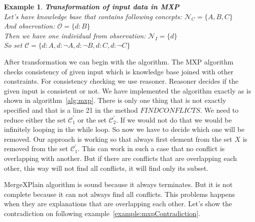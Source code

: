 \documentclass[12pt,a4paper]{article}
\newtheorem{example}{Example}[subsection]
\begin{document}
\begin{example}{\textbf{Transformation of input data in MXP}} \\
	\label{example:mxpTransform}
	\noindent Let's have knowledge base that contains following concepts: 
	$\mathcal{N}_{C} = \{ A, B, C \}$ \\
	And observation: $\mathcal{O} = \{ d:B \}$ \\
	Then we have one individual from observation: $\mathcal{N}_{I} = \{ d \} $ \\
	So set $\mathcal{C} = \{ d:A, d:\neg A, d:\neg B, d:C, d:\neg C \}$
\end{example}

After transformation we can begin with the algorithm. The MXP algorithm checks consistency of given input which is knowledge base joined with other constraints. For consistency checking we use reasoner. Reasoner decides if the given input is consistent or not. We have implemented the algorithm exactly as is shown in algorithm~\ref{alg:mxp}. There is only one thing that is not exactly specified and that is a line 21 in the method $\mathit{FINDCONFLICTS}$. We need to reduce either the set $\mathcal{C}^{\prime}_{1}$ or the set $\mathcal{C}^{\prime}_{2}$. If we would not do that we would be infinitely looping in the while loop. So now we have to decide which one will be removed. Our approach is working so that always first element from the set $X$ is removed from the set $\mathcal{C}^{\prime}_{1}$. This can work in such a case that no conflict is overlapping with another. But if there are conflicts that are overlapping each other, this way will not find all conflicts, it will find only its subset. 

MergeXPlain algorithm is sound because it always terminates. But it is not complete because it can not always find all conflicts. This problems happens when they are explanations that are overlapping each other. Let's show the contradiction on following example~\ref{example:mxpContradiction}.
\end{document}
